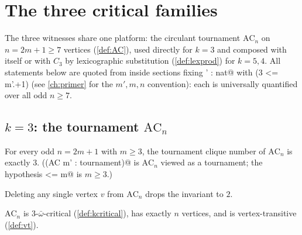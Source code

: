 \chapter{The three critical families}
\label{ch:families}

The three witnesses share one platform: the circulant tournament
$\mathrm{AC}_n$ on $n = 2m{+}1 \ge 7$ vertices (\cref{def:AC}), used
directly for $k=3$ and composed with itself or with $C_3$ by
lexicographic substitution (\cref{def:lexprod}) for $k = 5, 4$. All
statements below are quoted from inside sections fixing
\rocqinline@m' : nat@ with \rocqinline@(3 <= m'.+1)%
(see \cref{ch:primer} for the $m', m, n$ convention): each is
universally quantified over all odd $n \ge 7$.

\section*{$k = 3$: the tournament $\mathrm{AC}_n$}




\begin{decoded}
For every odd $n = 2m+1$ with $m \ge 3$, the tournament clique number
of $\mathrm{AC}_n$ is exactly $3$. (\rocqinline@(AC m' : tournament)@
is $\mathrm{AC}_n$ viewed as a tournament; the hypothesis
 <= m@ is $m \ge 3$.)
\end{decoded}






\begin{decoded}
Deleting any single vertex $v$ from $\mathrm{AC}_n$ drops the
invariant to $2$.
\end{decoded}






\label{res:card_AC}

\label{res:AC_vertex_transitive}

\begin{decoded}
$\mathrm{AC}_n$ is $3$-$\bar\omega$-critical (\cref{def:kcritical}),
has exactly $n$ vertices, and is vertex-transitive (\cref{def:vt}).
\end{decoded}

